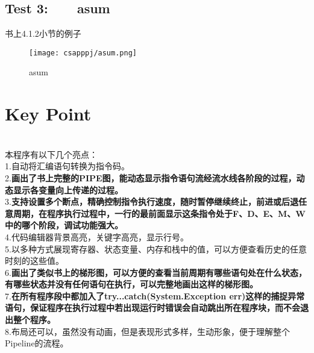 \documentclass{article}
\begin{document}
\begin{spacing}{1.5}
\subsection{Test 3:\ \ \ \ asum}
书上4.1.2小节的例子
\noindent
{}
\setlength{\hangindent}{3.3em}\\
\begin{figure}[htbp]
\centering
\texttt{[image: csapppj/asum.png]}
\caption{asum}
\end{figure}
\section{Key Point}
\noindent
{}
\setlength{\hangindent}{2.8em}\\
本程序有以下几个亮点：\\
1.自动将汇编语句转换为指令码。\\
2.\textbf{画出了书上完整的PIPE图，能动态显示指令语句流经流水线各阶段的过程，动态显示各变量向上传递的过程。}\\
3.\textbf{支持设置多个断点，精确控制指令执行速度，随时暂停继续终止，前进或后退任意周期，在程序执行过程中，一行的最前面显示这条指令处于F、D、E、M、W中的哪个阶段，调试功能强大。}\\
4.代码编辑器背景高亮，关键字高亮，显示行号。\\
5.以多种方式展现寄存器、状态变量、内存和栈中的值，可以方便查看历史的任意时刻的这些值。\\
6.\textbf{画出了类似书上的梯形图，可以方便的查看当前周期有哪些语句处在什么状态，有哪些状态并没有任何语句在执行，可以完整地画出这样的梯形图。}\\
7.\textbf{在所有程序段中都加入了try...catch(System.Exception err)这样的捕捉异常语句，保证程序在执行过程中若出现运行时错误会自动跳出所在程序块，而不会退出整个程序。}\\
8.布局还可以，虽然没有动画，但是表现形式多样，生动形象，便于理解整个Pipeline的流程。

\end{spacing}
\end{document}
